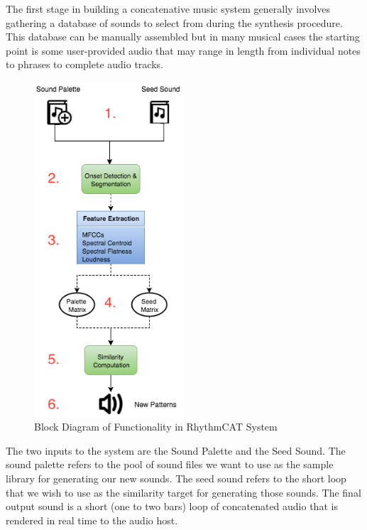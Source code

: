 The first stage in building a concatenative music system generally involves gathering a database of sounds to select from during the synthesis procedure. This database can be manually assembled but in many musical cases the starting point is some user-provided audio that may range in length from individual notes to phrases to complete audio tracks.

\begin{figure}
	\begin{center}
		\includegraphics[width=0.5\textwidth]{ch05_pyconcat/figures/rhythmcat_flowchart.png}
	\end{center}
	\caption[Block Diagram of Functionality in RhythmCAT System]{Block Diagram of Functionality in RhythmCAT System}
	\label{fig:rhythmcat_flowchart}
\end{figure}
 
The two inputs to the system are the Sound Palette and the Seed Sound. The sound palette refers to the pool of sound files we want to use as the sample library for generating our new sounds. The seed sound refers to the short loop that we wish to use as the similarity target for generating those sounds. The final output sound is a short (one to two bars) loop of concatenated audio that is rendered in real time to the audio host.

